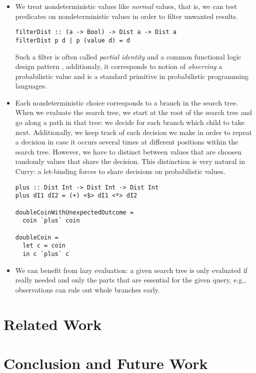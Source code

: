 \documentclass[
12pt, %
a4paper, %
oneside, %
]{llncs}
\begin{document}
\begin{itemize}

\item We treat nondeterministic values like \emph{normal} values, that
  is, we can test predicates on nondeterministic values in order to
  filter unwanted results. %

\begin{verbatim}
filterDist :: (a -> Bool) -> Dist a -> Dist a
filterDist p d | p (value d) = d
\end{verbatim}

  Such a filter is often called \emph{partial identity} and a common
  functional logic design pattern \cite{funcLogPattern}, additionaly,
  it corresponds to notion of \emph{observing} a probabilistic value
  and is a standard primitive in probabilistic programming
  languages. %
 
\item Each nondeterministic choice corresponds to a branch in the
  search tree. %
  When we evaluate the search tree, we start at the root of the search
  tree and go along a path in that tree: we decide for each branch
  which child to take next. %
  Additionally, we keep track of each decision we make in order to
  repeat a decision in case it occurs several times at different
  positions within the search tree. %
  However, we have to distinct between values that are choosen
  randomly values that share the decision. %
  This distinction is very natural in Curry: a let-binding forces to
  share decisions on probabilistic values. %

\begin{verbatim}
plus :: Dist Int -> Dist Int -> Dist Int
plus dI1 dI2 = (+) <$> dI1 <*> dI2

doubleCoinWithUnexpectedOutcome =
  coin `plus` coin

doubleCoin =
  let c = coin
  in c `plus` c
\end{verbatim}

\item We can benefit from lazy evaluation: a given search tree is only
  evaluated if really needed and only the parts that are essential for
  the given query, e.g., observations can rule out whole branches
  early. %

\end{itemize}

\section{Related Work}

\section{Conclusion and Future Work}



\end{document}
